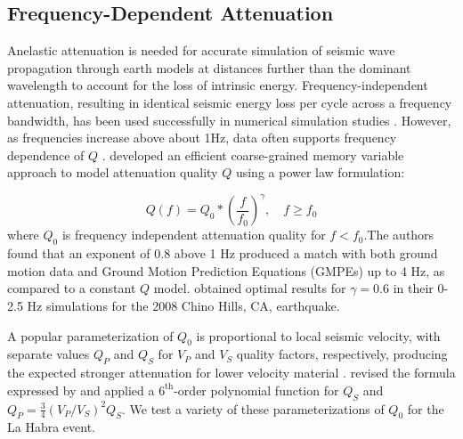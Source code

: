 \subsection{Frequency-Dependent Attenuation}
Anelastic attenuation is needed for accurate simulation of seismic wave propagation through earth models at distances further than the dominant wavelength to account for the loss of intrinsic energy. Frequency-independent attenuation, resulting in identical seismic energy loss per cycle across a frequency bandwidth, has been used successfully in numerical simulation studies . However, as frequencies increase above about 1Hz, data often supports frequency dependence of $Q$ . \citet{withersMemoryEfficientSimulation2015} developed an efficient coarse-grained memory variable approach to model attenuation quality $Q$ using a power law formulation:

\begin{equation}\label{eq:highf-3}
  Q(f)=Q_{0} *\left(\frac{f}{f_{0}}\right)^{\gamma}, \quad f \geq f_{0}
\end{equation}
\noindent where $Q_0$ is frequency independent attenuation quality for $f<f_{0}$.The authors found that an exponent of 0.8 above 1 Hz produced a match with both ground motion data and Ground Motion Prediction Equations (GMPEs) up to 4 Hz, as compared to a constant $Q$ model. \citet{savranGroundMotionSimulation2019} obtained optimal results for $\gamma = 0.6$ in their 0-2.5 Hz simulations for the 2008 Chino Hills, CA, earthquake.

A popular parameterization of $Q_0$ is proportional to local seismic velocity, with separate values $Q_P$ and $Q_S$ for $V_P$ and $V_S$ quality factors, respectively, producing the expected stronger attenuation for lower velocity material \citep{haukssonAttenuationModelsThree2006}. \citet{taborda2014ground}  revised the formula expressed by \citet{brocher2008compressional} and applied a $6^{\text{th}}$-order polynomial function for $Q_S$ and $Q_P=\frac{3}{4}\left(V_P/V_S\right)^2Q_S$. We test a variety of these parameterizations of $Q_0$ for the La Habra event.

